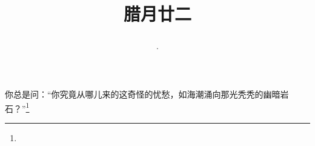 \title{\date[d=1,m=2,y=2024][year:cn-y,年,month:cn,day:cn,日,·,weekday]·腊月廿二 }
你总是问：“你究竟从哪儿来的这奇怪的忧愁，如海潮涌向那光秃秃的幽暗岩石？”\footnote{ }

